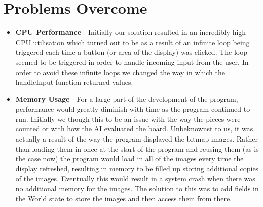 \documentclass[11]{article}
\begin{document}
	\section{Problems Overcome}
		\begin{itemize}
			\item \textbf{CPU Performance} - Initially our solution resulted in an incredibly high CPU utilisation which turned out to be as a result of an infinite loop being triggered each time a button (or area of the display) was clicked. The loop seemed to be triggered in order to handle incoming input from the user. In order to avoid these infinite loops we changed the way in which the handleInput function returned values.
			\item \textbf{Memory Usage} - For a large part of the development of the program, performance would greatly diminish with time as the program continued to run. Initially we though this to be an issue with the way the pieces were counted or with how the AI evaluated the board. Unbeknownst to us, it was actually a result of the way the program displayed the bitmap images. Rather than loading them in once at the start of the program and reusing them (as is the case now) the program would load in all of the images every time the display refreshed, resulting in memory to be filled up storing additional copies of the images. Eventually this would result in a system crash when there was no additional memory for the images. The solution to this was to add fields in the World state to store the images and then access them from there.
		\end{itemize}
\end{document}
